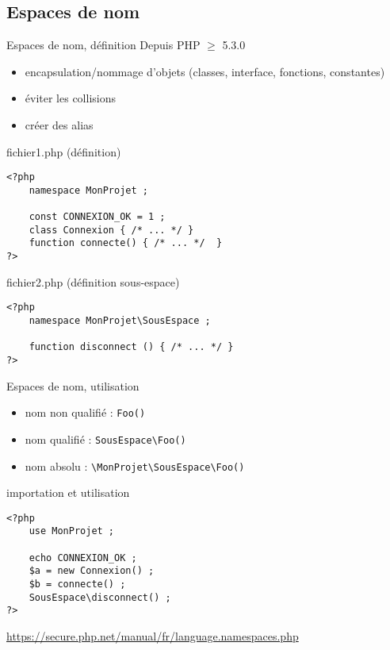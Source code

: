 \subsection{Espaces de nom}

\begin{frame}[containsverbatim]{Espaces de nom, définition}
	Depuis PHP $\ge$ 5.3.0
	\begin{itemize}
		\item encapsulation/nommage d'objets (classes, interface, fonctions, constantes)
		\item éviter les collisions
		\item créer des alias
	\end{itemize}
	\begin{block}{fichier1.php (définition)}
		\begin{lstlisting}
<?php
	namespace MonProjet ;
	
	const CONNEXION_OK = 1 ;
	class Connexion { /* ... */ }
	function connecte() { /* ... */  }
?>
		\end{lstlisting}
	\end{block}
	\begin{block}{fichier2.php (définition sous-espace)}
		\begin{lstlisting}
<?php
	namespace MonProjet\SousEspace ;

	function disconnect () { /* ... */ }
?>
		\end{lstlisting}
	\end{block}
\end{frame}

\begin{frame}[containsverbatim]{Espaces de nom, utilisation}
	\begin{itemize}
		\item nom non qualifié : \texttt{Foo()}
		\item nom qualifié : \texttt{SousEspace\textbackslash{}Foo()}
		\item nom absolu : \texttt{\textbackslash{}MonProjet\textbackslash{}SousEspace\textbackslash{}Foo()}
	\end{itemize}
	\begin{block}{importation et utilisation}
		\begin{lstlisting}
<?php
	use MonProjet ;
	
	echo CONNEXION_OK ;
	$a = new Connexion() ;
	$b = connecte() ;
	SousEspace\disconnect() ;
?>
		\end{lstlisting}
	\end{block}
	\url{https://secure.php.net/manual/fr/language.namespaces.php}
\end{frame}


